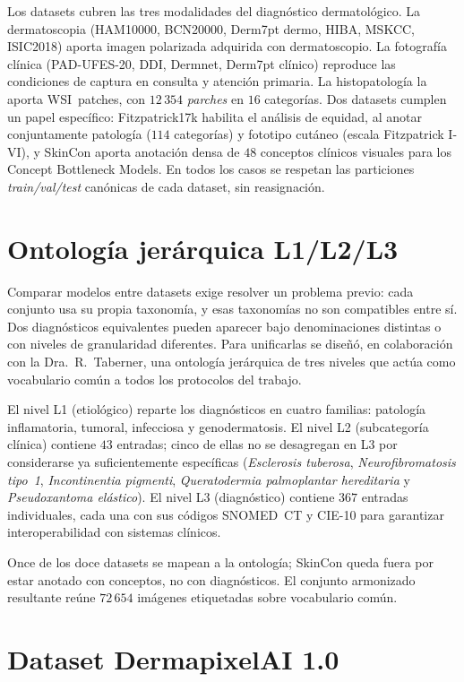 Los datasets cubren las tres modalidades del diagnóstico
dermatológico. La dermatoscopia (HAM10000, BCN20000, Derm7pt dermo,
HIBA, MSKCC, ISIC2018) aporta imagen polarizada adquirida con
dermatoscopio. La fotografía clínica (PAD-UFES-20, DDI, Dermnet,
Derm7pt clínico) reproduce las condiciones de captura en consulta y
atención primaria. La histopatología la aporta WSI~patches, con
$12\,354$ \emph{parches} en $16$ categorías. Dos datasets cumplen
un papel específico: Fitzpatrick17k habilita el análisis de equidad,
al anotar conjuntamente patología ($114$ categorías) y fototipo
cutáneo (escala Fitzpatrick I-VI), y SkinCon aporta anotación densa
de $48$ conceptos clínicos visuales para los Concept Bottleneck
Models. En todos los casos se respetan las particiones
\emph{train/val/test} canónicas de cada dataset, sin reasignación.

\section{Ontología jerárquica L1/L2/L3}
\label{sec:ontologia}

Comparar modelos entre datasets exige resolver un problema previo:
cada conjunto usa su propia taxonomía, y esas taxonomías no son
compatibles entre sí. Dos diagnósticos equivalentes pueden aparecer
bajo denominaciones distintas o con niveles de granularidad
diferentes. Para unificarlas se diseñó, en colaboración
con la Dra.~R.~Taberner, una ontología jerárquica de tres niveles
que actúa como vocabulario común a todos los protocolos del trabajo.

El nivel L1 (etiológico) reparte los diagnósticos en cuatro
familias: patología inflamatoria, tumoral, infecciosa y
genodermatosis. El nivel L2 (subcategoría clínica) contiene
$43$ entradas; cinco de ellas no se desagregan en L3 por
considerarse ya suficientemente específicas (\emph{Esclerosis
tuberosa}, \emph{Neurofibromatosis tipo~1}, \emph{Incontinentia
pigmenti}, \emph{Queratodermia palmoplantar hereditaria} y
\emph{Pseudoxantoma elástico}). El nivel L3 (diagnóstico) contiene
$367$ entradas individuales, cada una con sus códigos SNOMED~CT y
CIE-10 para garantizar interoperabilidad con sistemas clínicos.

Once de los doce datasets se mapean a la ontología; SkinCon queda
fuera por estar anotado con conceptos, no con diagnósticos. El
conjunto armonizado resultante reúne $72\,654$ imágenes etiquetadas
sobre vocabulario común.

\section{Dataset DermapixelAI 1.0}
\label{sec:dermapixel}

